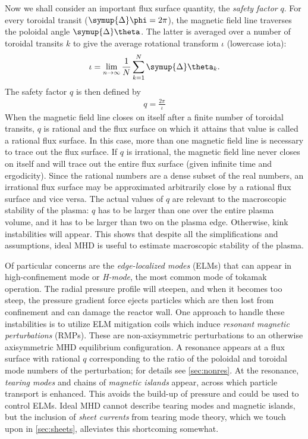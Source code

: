 Now we shall consider an important flux surface quantity, the \emph{safety factor} $q$. For every toroidal transit ($\symup{\Delta} \phi = 2 \pi$), the magnetic field line traverses the poloidal angle $\symup{\Delta} \theta$. The latter is averaged over a number of toroidal transits $k$ to give the average rotational transform $\iota$ (lowercase iota):
\begin{gather}
  \iota = \lim_{n \to \infty} \frac{1}{N} \sum_{k = 1}^{N} \symup{\Delta} \theta_{k}.
\end{gather}
The safety factor $q$ is then defined by
\begin{gather}
  q = \frac{2 \pi}{\iota}
\end{gather}
When the magnetic field line closes on itself after a finite number of toroidal transits, $q$ is rational and the flux surface on which it attains that value is called a rational flux surface. In this case, more than one magnetic field line is necessary to trace out the flux surface. If $q$ is irrational, the magnetic field line never closes on itself and will trace out the entire flux surface (given infinite time and ergodicity). Since the rational numbers are a dense subset of the real numbers, an irrational flux surface may be approximated arbitrarily close by a rational flux surface and vice versa. The actual values of $q$ are relevant to the macroscopic stability of the plasma: $q$ has to be larger than one over the entire plasma volume, and it has to be larger than two on the plasma edge. Otherwise, kink instabilities will appear. This shows that despite all the simplifications and assumptions, ideal MHD is useful to estimate macroscopic stability of the plasma.

Of particular concerns are the \emph{edge-localized modes} (ELMs) that can appear in high-confinement mode or \emph{H-mode}, the most common mode of tokamak operation. The radial pressure profile will steepen, and when it becomes too steep, the pressure gradient force ejects particles which are then lost from confinement and can damage the reactor wall. One approach to handle these instabilities is to utilize ELM mitigation coils which induce \emph{resonant magnetic perturbations} (RMPs). These are non-axisymmetric perturbations to an otherwise axisymmetric MHD equilibrium configuration. A resonance appears at a flux surface with rational $q$ corresponding to the ratio of the poloidal and toroidal mode numbers of the perturbation; for details see \cref{sec:nonres}. At the resonance, \emph{tearing modes} and chains of \emph{magnetic islands} appear, across which particle transport is enhanced. This avoids the build-up of pressure and could be used to control ELMs. Ideal MHD cannot describe tearing modes and magnetic islands, but the inclusion of \emph{sheet currents} from tearing mode theory, which we touch upon in \cref{sec:sheets}, alleviates this shortcoming somewhat.

